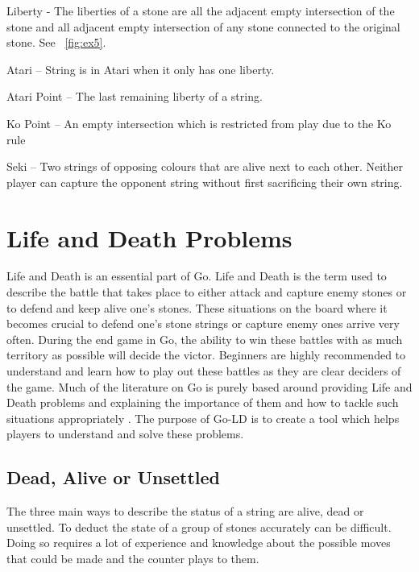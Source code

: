 \documentclass{l4proj}
\begin{document}
Liberty - The liberties of a stone are all the adjacent empty intersection of the stone and all adjacent empty intersection of any stone connected to the original stone. See ~\autoref{fig:ex5}.





Atari – String is in Atari when it only has one liberty.

Atari Point – The last remaining liberty of a string.

Ko Point –  An empty intersection which is restricted from play due to the Ko rule

Seki – Two strings of opposing colours that are alive next to each other. Neither player can capture the opponent string without first sacrificing their own string.





\section{Life and Death Problems}

Life and Death is an essential part of Go. Life and Death is the term used to describe the battle that takes place to either attack and capture enemy stones or to defend and keep alive one's stones.  These situations on the board where it becomes crucial to defend one’s stone strings or capture enemy ones arrive very often. During the end game in Go, the ability to win these battles with as much territory as possible will decide the victor. Beginners are highly recommended to understand and learn how to play out these battles as they are clear deciders of the game. Much of the literature on Go is purely based around providing Life and Death problems and explaining the importance of them and how to tackle such situations appropriately \citep{Cho1993}\citep{Davies1975}. The purpose of Go-LD is to create a tool which helps players to understand and solve these problems.

\subsection{Dead, Alive or Unsettled}

The three main ways to describe the status of a string are alive, dead or unsettled. To deduct the state of a group of stones accurately can be difficult. Doing so requires a lot of experience and knowledge about the possible moves that could be made and the counter plays to them.
\end{document}
